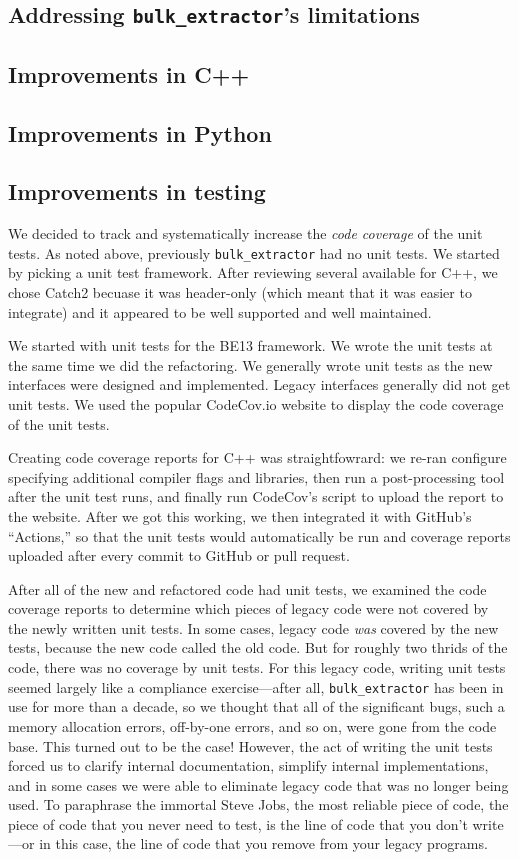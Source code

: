 \documentclass[5p]{elsarticle}
\newcommand{\be}{\texttt{bulk\_extractor}\xspace}
\begin{document}
\subsection{Addressing \be's limitations}
\subsection{Improvements in C++}
\subsection{Improvements in Python}
\subsection{Improvements in testing}
We decided to track and systematically increase the \emph{code
coverage} of the unit tests. As noted above, previously \be had no
unit tests. We started by picking a unit test framework. After
reviewing several available for C++, we chose Catch2 becuase it was
header-only (which meant that it was easier to integrate) and it
appeared to be well supported and well maintained.

We started with unit tests for the BE13 framework. We wrote the unit
tests at the same time we did the refactoring. We generally wrote unit
tests as the new interfaces were designed and implemented. Legacy
interfaces generally did not get unit tests.  We used the popular
CodeCov.io website to display the code coverage of the unit tests.

Creating code coverage reports for C++ was straightfowrard: we re-ran
configure specifying additional compiler flags and libraries, then run
a post-processing tool after the unit test runs, and finally run
CodeCov's script to upload the report to the website. After we got
this working, we then integrated it with GitHub's ``Actions,'' so that
the unit tests would automatically be run and coverage reports
uploaded after every commit to GitHub or pull request.

After all of the new and refactored code had unit tests, we examined
the code coverage reports to determine which pieces of legacy code
were not covered by the newly written unit tests. In some cases,
legacy code \emph{was} covered by the new tests, because the new code
called the old code. But for roughly two thrids of the code, there was
no coverage by unit tests. For this legacy code, writing unit tests
seemed largely like a compliance
exercise---after all, \be has been in use for more than a decade, so
we thought that all of the significant bugs, such a memory allocation
errors, off-by-one errors, and so on, were gone from the code base.
This turned out to be the case! However, the act of writing the unit
tests forced us to clarify internal documentation, simplify
internal implementations, and in some cases we were able to eliminate
legacy code that was no longer being used. To paraphrase the immortal
Steve Jobs, the most reliable piece of code, the piece of code that
you never need to test, is the line of code that you don't write---or
in this case, the line of code that you remove from your legacy programs.
\end{document}

